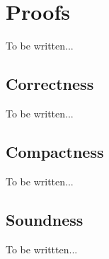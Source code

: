 \section{Proofs}

To be written...

\subsection{Correctness}

To be written...

\subsection{Compactness}

To be written...

\subsection{Soundness}

To be writtten...
